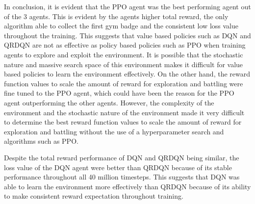 In conclusion, it is evident that the PPO agent was the best performing agent out of the 3 agents. This is evident by the agents higher total reward, the only algorithm able to collect the first gym badge and the consistent low loss value throughout the training. This suggests that value based policies such as DQN and QRDQN are not as effective as policy based policies such as PPO when training agents to explore and exploit the environment. It is possible that the stochastic nature and massive search space of this environment makes it difficult for value based policies to learn the environment effectively. On the other hand, the reward function values to scale the amount of reward for exploration and battling were fine tuned to the PPO agent, which could have been the reason for the PPO agent outperforming the other agents. However, the complexity of the environment and the stochastic nature of the environment made it very difficult to determine the best reward function values to scale the amount of reward for exploration and battling without the use of a hyperparameter search and algorithms such as PPO. 

Despite the total reward performance of DQN and QRDQN being similar, the loss value of the DQN agent were better than QRDQN because of its stable performance throughout all 40 million timesteps. This suggests that DQN was able to learn the environment more effectively than QRDQN because of its ability to make consistent reward expectation throughout training.
